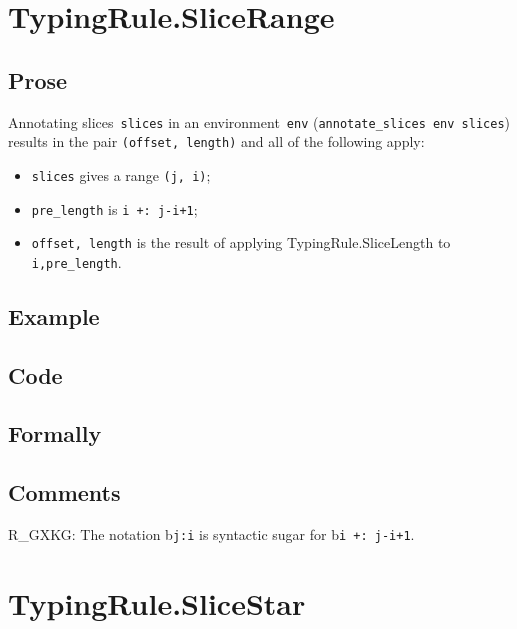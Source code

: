 \documentclass{book}
\begin{document}

\section{TypingRule.SliceRange \label{sec:TypingRule.SliceRange}}

  \subsection{Prose}
      Annotating slices~\texttt{slices} in an environment~\texttt{env}
(\texttt{annotate\_slices env slices}) results in the pair \texttt{(offset,
length)} and all of the following apply:
   \begin{itemize}
   \item \texttt{slices} gives a range \texttt{(j, i)};
   \item \texttt{pre\_length} is \texttt{i +: j-i+1};
   \item \texttt{offset, length} is the result of applying TypingRule.SliceLength to \texttt{i,pre\_length}.
   \end{itemize}

  \subsection{Example}

  \subsection{Code}

\begin{emptyformal}
    \subsection{Formally}
\end{emptyformal}

\subsection{Comments}
    R\_GXKG: The notation b\texttt{j:i} is syntactic sugar for b\texttt{i +: j-i+1}.

\section{TypingRule.SliceStar \label{sec:TypingRule.SliceStar}}
\end{document}
